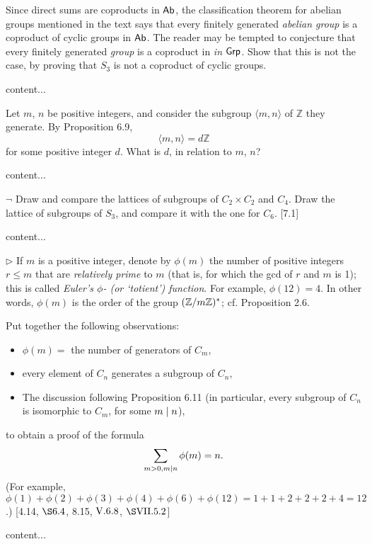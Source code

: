\begin{exercise}
	Since direct sums are coproducts in $\textsf{Ab}$, the classification theorem for abelian groups mentioned in the text says that every finitely generated \emph{abelian group} is a coproduct of cyclic groups in $\textsf{Ab}$. The reader may be tempted to conjecture that every finitely generated \emph{group} is a coproduct in \emph{in} $\textsf{Grp}$. Show that this is not the case, by proving that $S_3$ is not a coproduct of cyclic groups.
\end{exercise}
\begin{solution}
	content...
\end{solution}

\begin{exercise}
	Let $m$, $n$ be positive integers, and consider the subgroup $\langle m,n\rangle$ of $\mathbb{Z}$ they generate. By Proposition 6.9, 
	\[
		\langle m,n\rangle = d\mathbb{Z}
	\]
	for some positive integer $d$. What is $d$, in relation to $m$, $n$?
\end{exercise}
\begin{solution}
	content...
\end{solution}

\begin{exercise}
	$\neg$ Draw and compare the lattices of subgroups of $C_2\times C_2$ and $C_4$. Draw the lattice of subgroups of $S_3$, and compare it with the one for $C_6$. [7.1] 
\end{exercise}
\begin{solution}
	content...
\end{solution}

\begin{exercise}
	$\triangleright$ If $m$ is a positive integer, denote by $\phi(m)$ the number of positive integers $r\leq m$ that are \emph{relatively prime} to $m$ (that is, for which the gcd of $r$ and $m$ is 1); this is called \emph{Euler's $\phi$- (or `totient') function}. For example, $\phi(12) = 4$. In other words, $\phi(m)$ is the order of the group $(\mathbb{Z}/m\mathbb{Z})^*$; cf. Proposition 2.6.
	
	Put together the following observations:
	\begin{itemize}
		\item $\phi(m) =$ the number of generators of $C_m$,
		\item every element of $C_n$ generates a subgroup of $C_n$,
		\item The discussion following Proposition 6.11 (in particular, every subgroup of $C_n$ is isomorphic to $C_m$, for some $m\mid n$),
	\end{itemize}
	to obtain a proof of the formula
	\[
		\sum_{m>0,m\mid n}\phi(m) = n.
	\]
	(For example, $\phi(1) + \phi(2) + \phi(3) + \phi(4) + \phi(6) + \phi(12) = 1 + 1 + 2 + 2 + 2 + 4 = 12$.) [4.14, $\S 6.4$, 8.15, $\RNo{5}.6.8$, $\S \RNo{7}.5.2$]
\end{exercise}
\begin{solution}
	content...
\end{solution}

